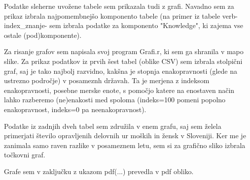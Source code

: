 \documentclass[11pt,a4paper]{article}
\begin{document}
Podatke sleherne uvožene tabele sem prikazala tudi z grafi. Navadno sem za prikaz izbrala najpomembnejšo komponento tabele (na primer iz tabele verb-index_znanje- sem izbrala podatke za komponento "Knowledge", ki zajema vse ostale (pod)komponente). 

Za risanje grafov sem napisala svoj program Grafi.r, ki sem ga shranila v mapo slike.
Za prikaz podatkov iz prvih šest tabel (oblike CSV) sem izbrala stolpični graf, saj je tako najbolj razvidno, kakšna je stopnja enakopravnosti (glede na ustrezno področje) v posameznh  državah. Ta je merjena z indeksom enakopravnosti, posebne merske enote, s pomočjo katere na enostaven način lahko razberemo (ne)enakosti med spoloma (indeks=100 pomeni popolno enakopravnost, indeks=0 pa neenakopravnost).

Podatke iz zadnjih dveh tabel sem združila v enem grafu, saj sem želela primerjati število opravljenih delovnih ur moških in žensk v Sloveniji. Ker me je zanimala samo raven razlike v posameznem letu, sem si za grafično sliko izbrala točkovni graf.

Grafe sem v zaključku z ukazom pdf(...) prevedla v pdf obliko.






\end{document}
